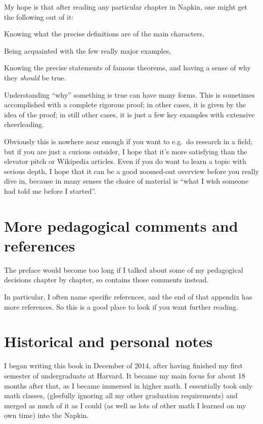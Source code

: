 My hope is that after reading any particular chapter in Napkin,
one might get the following out of it:
\begin{itemize}
	\ii Knowing what the precise definitions are of the main characters,

	\ii Being acquainted with the few really major examples,

	\ii Knowing the precise statements of famous theorems,
	and having a sense of why they \emph{should} be true.
\end{itemize}
Understanding ``why'' something is true can have many forms.
This is sometimes accomplished with a complete rigorous proof;
in other cases, it is given by the idea of the proof;
in still other cases, it is just a few key examples
with extensive cheerleading.

Obviously this is nowhere near enough if you want to e.g.\ do research in a field;
but if you are just a curious outsider,
I hope that it's more satisfying than the elevator pitch or Wikipedia articles.
Even if you do want to learn a topic with serious depth,
I hope that it can be a good zoomed-out overview before you really dive in,
because in many senses the choice of material is
``what I wish someone had told me before I started''.


\section*{More pedagogical comments and references}
The preface would become too long if I talked about
some of my pedagogical decisions chapter by chapter,
so  contains those comments instead.

In particular, I often name specific references,
and the end of that appendix has more references.
So this is a good place to look if you want further reading.

\section*{Historical and personal notes}
I began writing this book in December of 2014,
after having finished my first semester of undergraduate at Harvard.
It became my main focus for about 18 months after that,
as I became immersed in higher math.
I essentially took only math classes,
(gleefully ignoring all my other graduation requirements)
and merged as much of it as I could
(as well as lots of other math I learned on my own time)
into the Napkin.

